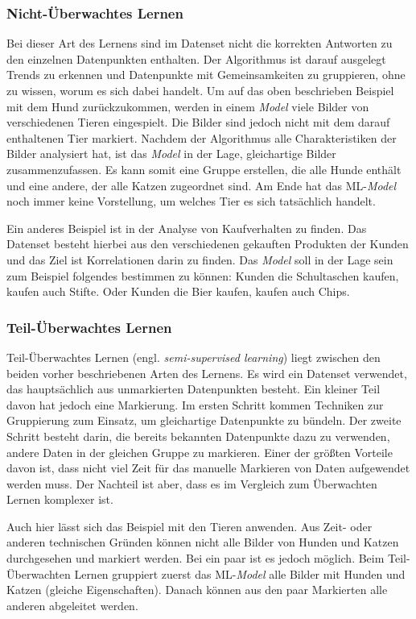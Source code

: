 \subsubsection{Nicht-Überwachtes Lernen}
Bei dieser Art des Lernens sind im Datenset nicht die korrekten Antworten zu den einzelnen Datenpunkten enthalten. Der Algorithmus ist darauf ausgelegt Trends zu erkennen und Datenpunkte mit Gemeinsamkeiten zu gruppieren, ohne zu wissen, worum es sich dabei handelt. Um auf das oben beschrieben Beispiel mit dem Hund zurückzukommen, werden in einem \textit{Model} viele Bilder von verschiedenen Tieren eingespielt. Die Bilder sind jedoch nicht mit dem darauf enthaltenen Tier markiert. Nachdem der Algorithmus alle Charakteristiken der Bilder analysiert hat, ist das \textit{Model} in der Lage, gleichartige Bilder zusammenzufassen. Es kann somit eine Gruppe erstellen, die alle Hunde enthält und eine andere, der alle Katzen zugeordnet sind. Am Ende hat das ML-\textit{Model} noch immer keine Vorstellung, um welches Tier es sich tatsächlich handelt.

Ein anderes Beispiel ist in der Analyse von Kaufverhalten zu finden. Das Datenset besteht hierbei aus den verschiedenen gekauften Produkten der Kunden und das Ziel ist Korrelationen darin zu finden. Das \textit{Model} soll in der Lage sein zum Beispiel folgendes bestimmen zu können: Kunden die Schultaschen kaufen, kaufen auch Stifte. Oder Kunden die Bier kaufen, kaufen auch Chips.

\subsubsection{Teil-Überwachtes Lernen}
Teil-Überwachtes Lernen (engl. \textit{semi-supervised learning}) liegt zwischen den beiden vorher beschriebenen Arten des Lernens. Es wird ein Datenset verwendet, das hauptsächlich aus unmarkierten Datenpunkten besteht. Ein kleiner Teil davon hat jedoch eine Markierung. Im ersten Schritt kommen Techniken zur Gruppierung zum Einsatz, um gleichartige Datenpunkte zu bündeln. Der zweite Schritt besteht darin, die bereits bekannten Datenpunkte dazu zu verwenden, andere Daten in der gleichen Gruppe zu markieren. Einer der größten Vorteile davon ist, dass nicht viel Zeit für das manuelle Markieren von Daten aufgewendet werden muss. Der Nachteil ist aber, dass es im Vergleich zum Überwachten Lernen komplexer ist.

Auch hier lässt sich das Beispiel mit den Tieren anwenden. Aus Zeit- oder anderen technischen Gründen können nicht alle Bilder von Hunden und Katzen durchgesehen und markiert werden. Bei ein paar ist es jedoch möglich. Beim Teil-Überwachten Lernen gruppiert zuerst das ML-\textit{Model} alle Bilder mit Hunden und Katzen (gleiche Eigenschaften). Danach können aus den paar Markierten alle anderen abgeleitet werden.

